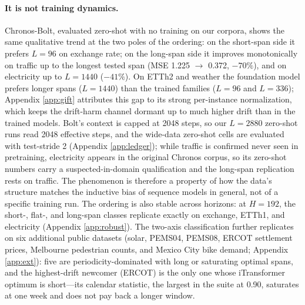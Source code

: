 

\paragraph{It is not training dynamics.}
\label{sec:zero}
Chronos-Bolt, evaluated zero-shot with no training on our corpora, shows the same qualitative trend at the two poles of the ordering: on the short-span side it prefers $L{=}96$ on exchange rate; on the long-span side it improves monotonically on traffic up to the longest tested span (MSE 1.225 $\to$ 0.372, $-70\%$), and on electricity up to $L{=}1440$ ($-41\%$). On ETTh2 and weather the foundation model prefers longer spans ($L{=}1440$) than the trained families ($L{=}96$ and $L{=}336$); Appendix \ref{app:gift} attributes this gap to its strong per-instance normalization, which keeps the drift-harm channel dormant up to much higher drift than in the trained models. Bolt's context is capped at 2048 steps, so our $L{=}2880$ zero-shot runs read 2048 effective steps, and the wide-data zero-shot cells are evaluated with test-stride 2 (Appendix \ref{app:ledger}); while traffic is confirmed never seen in pretraining, electricity appears in the original Chronos corpus, so its zero-shot numbers carry a suspected-in-domain qualification and the long-span replication rests on traffic. The phenomenon is therefore a property of how the data's structure matches the inductive bias of sequence models in general, not of a specific training run. The ordering is also stable across horizons: at $H{=}192$, the short-, flat-, and long-span classes replicate exactly on exchange, ETTh1, and electricity (Appendix \ref{app:robust}). The two-axis classification further replicates on six additional public datasets (solar, PEMS04, PEMS08, ERCOT settlement prices, Melbourne pedestrian counts, and Mexico City bike demand; Appendix \ref{app:ext}): five are periodicity-dominated with long or saturating optimal spans, and the highest-drift newcomer (ERCOT) is the only one whose iTransformer optimum is short---its calendar statistic, the largest in the suite at 0.90, saturates at one week and does not pay back a longer window.

